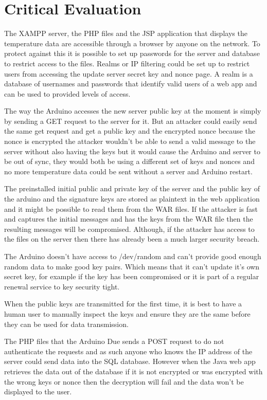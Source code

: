 \chapter{Critical Evaluation}
\label{crit}



The XAMPP server, the PHP files and the JSP application that displays the temperature data are accessible through a browser by anyone on the network. To protect against this it is possible to set up passwords for the server and database to restrict access to the files. Realms or IP filtering could be set up to restrict users from accessing the update server secret key and nonce page. A realm is a database of usernames and passwords that identify valid users of a web app and can be used to provided levels of access.

The way the Arduino accesses the new server public key at the moment is simply by sending a GET request to the server for it. But an attacker could easily send the same get request and get a public key and the encrypted nonce because the nonce is encrypted the attacker wouldn't be able to send a valid message to the server without also having the keys but it would cause the Arduino and server to be out of sync, they would both be using a different set of keys and nonces and no more temperature data could be sent without a server and Arduino restart.

The preinstalled initial public and private key of the server and the public key of the arduino and the signature keys are stored as plaintext in the web application and it might be possible to read them from the WAR files. If the attacker is fast and captures the initial messages and has the keys from the WAR file then the resulting messages will be compromised. Although, if the attacker has access to the files on the server then there has already been a much larger security breach.

The Arduino doesn't have access to /dev/random and can't provide good enough random data to make good key pairs. Which means that it can't update it's own secret key, for example if the key has been compromised or it is part of a regular renewal service to key security tight.

When the public keys are transmitted for the first time, it is best to have a human user to manually inspect the keys and ensure they are the same before they can be used for data transmission. 

The PHP files that the Arduino Due sends a POST request to do not authenticate the requests and as such anyone who knows the IP address of the server could send data into the SQL database. However when the Java web app retrieves the data out of the database if it is not encrypted or was encrypted with the wrong keys or nonce then the decryption will fail and the data won't be displayed to the user.

